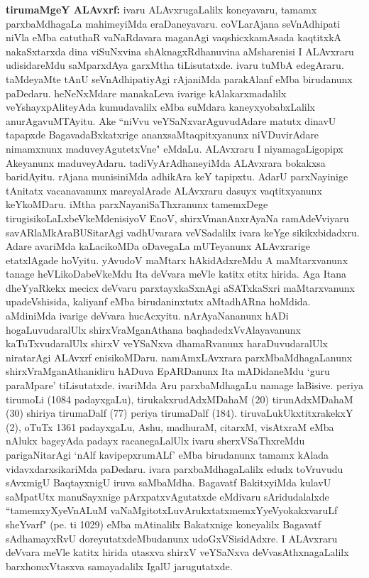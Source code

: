 {\large\textbf{tirumaMgeY ALAvxrf:}} ivaru ALAvxrugaLalilx koneyavaru, tamamx parxbaMdhagaLa mahimeyiMda eraDaneyavaru. coVLarAjana seVnAdhipati niVla eMba catuthaR vaNaRdavara maganAgi vaqshicxkamAsada kaqtitxkA nakaSxtarxda dina viSuNxvina shAknagxRdhanuvina aMsharenisi I ALAvxraru udisidareMdu saMparxdAya garxMtha tiLisutatxde. ivaru tuMbA edegAraru. taMdeyaMte tAnU seVnAdhipatiyAgi rAjaniMda parakAlanf eMba birudanunx paDedaru. heNeNxMdare manakaLeva ivarige kAlakarxmadalilx veYshayxpAliteyAda kumudavalilx eMba suMdara kaneyxyobabxLalilx anurAgavuMTAyitu. Ake ``niVvu veYSaNxva\-rAguvudAdare matutx dinavU tapapxde BagavadaBxkatxrige ananxsaMtaqpitxyanunx niVDuvirAdare nimamxnunx maduveyAgutetxVne" eMdaLu. ALAvxraru I niyamagaLigopipx Akeyanunx maduveyAdaru. tadiVyArAdhaneyiMda ALAvxrara bokakxsa baridAyitu. rAjana munisiniMda adhikAra keY tapipxtu. AdarU parxNayinige tAnitatx vacanavanunx mareyalArade ALAvxraru dasuyx vaqtitxyanunx keYkoMDaru. iMtha parxNayaniSaThxranunx tamemxDege tirugisikoLaLxbeVkeMdenisiyoV EnoV, shirxVmanAnxrAyaNa ramAdeVviyaru savARlaMkAraBUSitarAgi vadhUvarara veVSadalilx ivara keYge sikikxbidadxru. Adare avariMda kaLacikoMDa oDavegaLa mUTeyanunx ALAvxrarige etatxlAgade hoVyitu. yAvudoV maMtarx hAkidAdxreMdu A maMtarxvanunx tanage heVLikoDabeVkeMdu Ita deVvara meVle katitx etitx hirida. Aga Itana dheYyaRkekx mecicx deVvaru parxtayxkaSxnAgi aSATxkaSxri maMtarxvanunx upadeVshisida, kaliyanf eMba birudaninxtutx aMtadhARna hoMdida. aMdiniMda ivarige deVvara hucAcxyitu. nArAyaNananunx hADi hogaLuvudaralUlx shirxVraMganAthana baqhadedxVvAlayavanunx kaTuTxvudaralUlx shirxV veYSaNxva dhamaRvanunx haraDuvudaralUlx niratarAgi ALAvxrf enisikoMDaru. namAmxLAvxrara parxMbaMdhagaLanunx shirxVraMganAthanidiru hADuva EpARDanunx Ita mADidaneMdu `guru paraMpare' tiLisutatxde. ivariMda Aru parxbaMdhagaLu namage laBisive. periya tirumoLi (1084 padayxgaLu), tirukakxrudAdxMDahaM (20) tirunAdxMDahaM (30) shiriya tirumaDalf (77) periya tirumaDalf (184). tiruvaLukUkxtitxrakekxY (2), oTuTx 1361 padayxgaLu, Ashu, madhuraM, citarxM, visAtxraM eMba nAlukx bageyAda padayx racanegaLalUlx ivaru sherxVSaThxreMdu parigaNitarAgi `nAlf kavipepxrumALf' eMba birudanunx tamamx kAlada vidavxdarxsikariMda paDedaru. ivara parxbaMdhagaLalilx edudx toVruvudu sAvxmigU BaqtayxnigU iruva saMbaMdha. Bagavatf BakitxyiMda kulavU saMpatUtx manuSayxnige pArxpatxvAgutatxde eMdivaru sAridudalalxde ``tamemxyXyeVnALuM vaNaMgitotxLuvArukxtatxmemxYyeVyokakxvaruLf sheYvarf" (pe. ti 1029) eMba mAtinalilx Bakatxnige koneyalilx Bagavatf sAdhamayxRvU doreyutatxdeMbudanunx udoGxVSisidAdxre. I ALAvxraru deVvara meVle katitx hirida utasxva shirxV veYSaNxva deVvasAthxnagaLalilx barxhomxVtasxva samayadalilx IgalU jarugutatxde.
